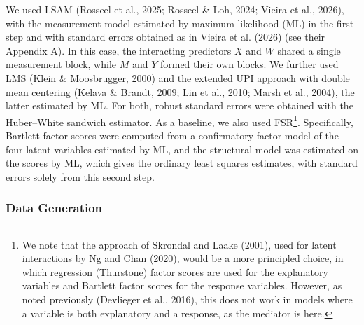 \documentclass[
  man,
  longtable,
  nolmodern,
  notxfonts,
  notimes,
  colorlinks=true,linkcolor=blue,citecolor=blue,urlcolor=blue]{apa7}
\begin{document}
We used LSAM (Rosseel et al., 2025; Rosseel \& Loh, 2024; Vieira et al.,
2026), with the measurement model estimated by maximum likelihood (ML)
in the first step and with standard errors obtained as in Vieira et al.
(2026) (see their Appendix A). In this case, the interacting predictors
\(X\) and \(W\) shared a single measurement block, while \(M\) and \(Y\)
formed their own blocks. We further used LMS (Klein \& Moosbrugger,
2000) and the extended UPI approach with double mean centering (Kelava
\& Brandt, 2009; Lin et al., 2010; Marsh et al., 2004), the latter
estimated by ML. For both, robust standard errors were obtained with the
Huber--White sandwich estimator. As a baseline, we also used
FSR\footnote{We note that the approach of Skrondal and Laake (2001),
  used for latent interactions by Ng and Chan (2020), would be a more
  principled choice, in which regression (Thurstone) factor scores are
  used for the explanatory variables and Bartlett factor scores for the
  response variables. However, as noted previously (Devlieger et al.,
  2016), this does not work in models where a variable is both
  explanatory and a response, as the mediator is here.}. Specifically,
Bartlett factor scores were computed from a confirmatory factor model of
the four latent variables estimated by ML, and the structural model was
estimated on the scores by ML, which gives the ordinary least squares
estimates, with standard errors solely from this second step.

\subsubsection{Data Generation}\label{data-generation}
\end{document}
